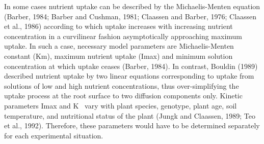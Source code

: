 



In some cases nutrient uptake can be described by the Michaelis-Menten equation (Barber, 1984; Barber and Cushman, 1981; Claassen and Barber, 1976; Claassen et al., 1986) according to which uptake increases with increasing nutrient concentration in a curvilinear fashion asymptotically approaching maximum uptake. 
In such a case, necessary model parameters are Michaelis-Menten constant (Km), maximum nutrient uptake (Imax) and minimum solution concentration at which uptake ceases (Barber, 1984). 
In contrast, Bouldin (1989) described nutrient uptake by two linear equations corresponding to uptake from solutions of low and high nutrient concentrations, thus over-simplifying the uptake process at the root surface to two diffusion components only.
Kinetic parameters Imax and K~ vary with plant species, genotype, plant age, soil temperature, and nutritional status of the plant (Jungk and Claassen, 1989; Teo et al., 1992). 
Therefore, these parameters would have to be determined separately for each experimental situation. 

